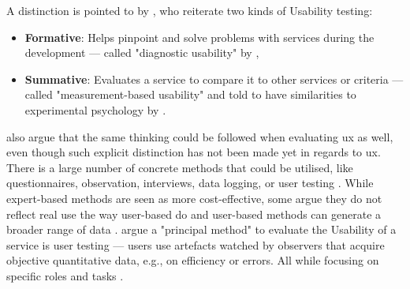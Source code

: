 A distinction is pointed to by \textcite{Juergen_et_all_2020}, who reiterate two kinds of Usability testing:

\begin{itemize}
    \item \textbf{Formative}: Helps pinpoint and solve problems with services during the development --- called "diagnostic usability" by \textcite{Lewis_2014},
    \item \textbf{Summative}: Evaluates a service to compare it to other services or criteria --- called "measurement-based usability" and told to have similarities to experimental psychology by \textcite{Lewis_2014}.
\end{itemize}

\textcite{Juergen_et_all_2020} also argue that the same thinking could be followed when evaluating \gls{ux} as well, even though such explicit distinction has not been made yet in regards to \gls{ux}.
There is a large number of concrete methods that could be utilised, like questionnaires, observation, interviews, data logging, or user testing \parencite{Juergen_et_all_2020}.
While expert-based methods are seen as more cost-effective, some argue they do not reflect real use the way user-based do and user-based methods can generate a broader range of data \parencite{Juergen_et_all_2020}.
\textcite{Juergen_et_all_2020} argue a "principal method" to evaluate the Usability of a service is user testing --- users use artefacts watched by observers that acquire objective quantitative data, e.g., on efficiency or errors.
All while focusing on specific roles and tasks \parencite{Wegge_Zimmermann_2007,McCloskey_2014}.

